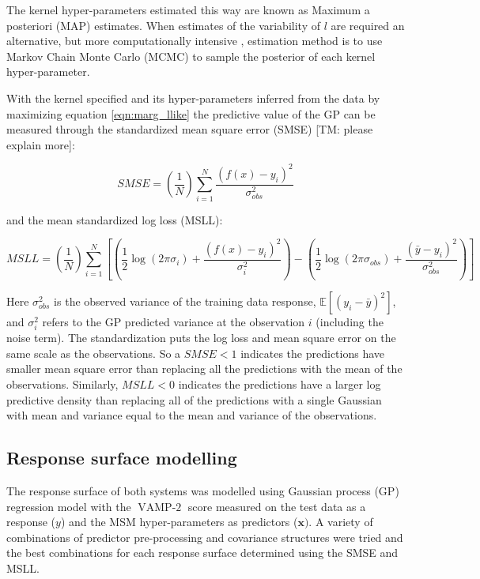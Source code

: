 The kernel hyper-parameters estimated this way are known as Maximum a posteriori (MAP) estimates. When estimates of the variability of $l$ are required an alternative, but more computationally intensive , estimation method is to use Markov Chain Monte Carlo (MCMC) to sample the posterior of each kernel hyper-parameter. 

With the kernel specified and its hyper-parameters inferred from the data by maximizing equation \ref{eqn:marg_llike} the predictive value of the GP can be measured through the standardized mean square error (SMSE) [TM: please explain more]: 

\begin{equation}\label{eqn:smse}
SMSE =\left(\frac{1}{N}\right) \sum_{i=1}^{N} \frac{\left(f(x)-y_{i}\right)^{2}}{\sigma_{obs}^{2}}
\end{equation}

and the mean standardized log loss (MSLL): 

\begin{equation}\label{eqn:msll}
MSLL=\left(\frac{1}{N}\right) \sum_{i=1}^{N}\left[\left(\frac{1}{2} \log \left(2 \pi \sigma_{i}\right)+\frac{\left(f(x)-y_{i}\right)^{2}}{\sigma_{i}^{2}}\right)-\left(\frac{1}{2} \log \left(2 \pi \sigma_{obs}\right)+\frac{\left(\bar{y}-y_{i}\right)^{2}}{\sigma_{obs}^{2}}\right)\right]
\end{equation}  

Here $\sigma_{obs}^{2}$ is the observed variance of the training data response, $\mathbb{E}\left[(y_{i}-\bar{y})^{2}\right]$, and $\sigma_{i}^{2}$ refers to the GP predicted variance at the observation $i$ (including the noise term). The standardization puts the log loss and mean square error on the same scale as the observations. So a $SMSE < 1$ indicates the predictions have smaller mean square error than replacing all the predictions with the mean of the observations. Similarly, $MSLL<0$ indicates the predictions have a larger log predictive density than replacing all of the predictions with a single Gaussian with mean and variance equal to the mean and variance of the observations.   

\subsection{Response surface modelling}\label{subsec:rsm}
The response surface of both systems was modelled using Gaussian process (GP) regression model with the $\operatorname{VAMP-2}$ score measured on the test data as a response ($y$) and the MSM hyper-parameters as predictors ($\mathbf{x})$. A variety of combinations of predictor pre-processing and covariance structures were tried and the best combinations for each response surface determined using the SMSE and MSLL. 


